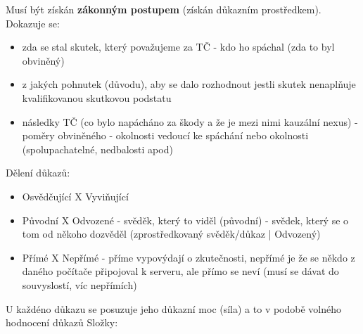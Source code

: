 Musí být získán \textbf{zákonným postupem} (získán důkazním prostředkem). \newline
Dokazuje se: 
\begin{itemize}
    \item zda se stal skutek, který považujeme za TČ - kdo ho spáchal (zda to byl obviněný)
    \item z jakých pohnutek (důvodu), aby se dalo rozhodnout jestli skutek nenaplňuje kvalifikovanou skutkovou podstatu
    \item následky TČ (co bylo napácháno za škody a že je mezi nimi kauzální nexus) - poměry obviněného - okolnosti vedoucí ke spáchání nebo okolnosti (spolupachatelné, nedbalosti apod)
\end{itemize}
Dělení důkazů:
\begin{itemize}
    \item Osvědčující X Vyviňující
    \item Původní X Odvozené - svěděk, který to viděl (původní) - svědek, který se o tom od někoho dozvěděl (zprostředkovaný svěděk/důkaz | Odvozený)
    \item Přímé X Nepřímé - příme vypovýdají o zkutečnosti, nepřímé je že se někdo z daného počítače připojoval k serveru, ale přímo se neví (musí se dávat do souvyslostí, víc nepřímích)
\end{itemize}
U každéno důkazu se posuzuje jeho důkazní moc (síla) a to v podobě volného hodnocení důkazů
Složky:
